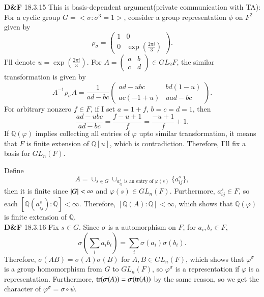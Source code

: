 \documentclass[a4paper, 12pt]{article}
\theoremstyle{Mydefinition}
\theoremstyle{Mytheorem}
\begin{document}
\noindent \textbf{D\&F} 18.3.15
This is basis-dependent argument(private communication with TA): For a cyclic group $G=<\sigma:\sigma^3 = 1>$, consider a group representation $\phi$ on $F^2$ given by
\begin{equation}
    \rho_\sigma = \begin{pmatrix}
    1 & 0\\
    0 & \exp\left(\frac{2\pi i}{3}\right)
    \end{pmatrix}.
\end{equation}
I'll denote $u = \exp\left(\frac{2\pi i}{3}\right)$. For $A = \begin{pmatrix}a & b\\ c & d\end{pmatrix}\in GL_2F$, the similar transformation is given by
\begin{equation}
    A^{-1}\rho_\sigma A = \frac{1}{ad-bc}\begin{pmatrix}
    ad-ubc & bd(1-u)\\
    ac(-1+u) & uad-bc
    \end{pmatrix}.
\end{equation}
For arbitrary nonzero $f\in F$, if I set $a=1+f$, $b=c=d=1$, then
\begin{equation}
    \frac{ad-ubc}{ad-bc} = \frac{f-u + 1}{f} = \frac{-u+1}{f} + 1.
\end{equation}
If $\mathbb{Q}(\varphi)$ implies collecting all entries of $\varphi$ upto similar transformation, it means that $F$ is finite extension of $\mathbb{Q}[u]$, which is contradiction. Therefore, I'll fix a basis for $GL_n(F)$.

Define
\begin{equation}
    A = \cup_{s\in G}\cup_{a^s_{ij}\textrm{ is an entry of }\varphi(s)}\{a^s_{ij}\},
\end{equation}
then it is finite since $\abs{G}<\infty$ and $\varphi(s)\in GL_n(F)$. Furthermore, $a^s_{ij}\in F$, so each $[\mathbb{Q}(a^s_{ij}):\mathbb{Q}]<\infty$. Therefore, $[\mathbb{Q}(A):\mathbb{Q}]<\infty$, which shows that $\mathbb{Q}(\varphi)$ is finite extension of $\mathbb{Q}$.\\

\noindent \textbf{D\&F} 18.3.16
Fix $s\in G$. Since $\sigma$ is a automorphism on $F$, for $a_i,b_i\in F$,
\begin{equation}
    \sigma\left(\sum_i a_ib_i\right) = \sum_i \sigma(a_i)\sigma(b_i).
\end{equation}
Therefore, $\sigma(AB)=\sigma(A)\sigma(B)$ for $A,B\in GL_n(F)$, which shows that $\varphi^\sigma$ is a group homomorphism from $G$ to $GL_n(F)$, so $\varphi^\sigma$ is a representation if $\varphi$ is a representation. Furthermore, $\tr(\sigma(A)) = \sigma(\tr(A))$ by the same reason, so we get the character of $\varphi^\sigma = \sigma\circ \psi$.
\end{document}
